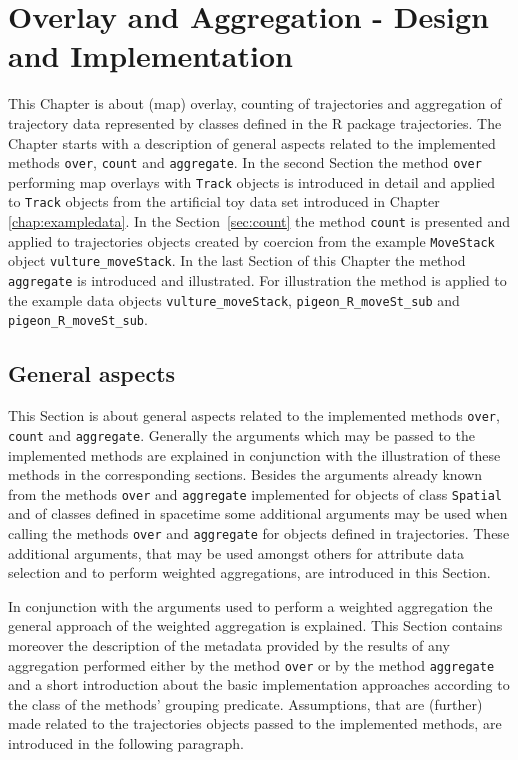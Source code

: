 \documentclass[12pt, oneside, a4paper]{scrbook}
\newcommand{\pkg}[1]{{\normalfont\fontseries{b}\selectfont #1}}
\let\proglang=\textsf
\let\code=\texttt
\begin{document}
\chapter{Overlay and Aggregation - Design and Implementation}
\label{chap:overandaggregate}

This Chapter is about (map) overlay, counting of trajectories and aggregation of trajectory data represented by classes defined in the \proglang{R} package \pkg{trajectories}.
The Chapter starts with a description of general aspects related to the implemented methods \code{over}, \code{count} and \code{aggregate}. 
In the second Section the method \code{over} performing map overlays with \code{Track} objects is introduced in detail and applied to \code{Track} objects from the artificial toy data set introduced in Chapter \ref{chap:exampledata}.
In the Section~\ref{sec:count} the method \code{count} is presented and applied to \pkg{trajectories} objects created by coercion from the example \code{MoveStack} object \code{vulture\_moveStack}.
In the last Section of this Chapter the method \code{aggregate} is introduced and illustrated.
For illustration the method is applied to the example data objects \code{vulture\_moveStack}, \code{pigeon\_R\_moveSt\_sub} and \code{pigeon\_R\_moveSt\_sub}.
\par\medskip


\section{General aspects}
\label{sec:generalaspects}

This Section is about general aspects related to the implemented methods \code{over}, \code{count} and \code{aggregate}.
Generally the arguments which may be passed to the implemented methods are explained in conjunction with the illustration of these methods in the corresponding sections.
Besides the arguments already known from the methods \code{over} and \code{aggregate} implemented for objects of class \code{Spatial} and of classes defined in \pkg{spacetime} some additional arguments may be used when calling the methods \code{over} and \code{aggregate} for objects defined in \pkg{trajectories}.
These additional arguments, that may be used amongst others for attribute data selection and to perform weighted aggregations, are introduced in this Section.
\par\medskip
In conjunction with the arguments used to perform a weighted aggregation the general approach of the weighted aggregation is explained.
This Section contains moreover the description of the metadata provided by the results of any aggregation performed either by the method \code{over} or by the method \code{aggregate} and
a short introduction about the basic implementation approaches according to the class of the methods' grouping predicate.
Assumptions, that are (further) made related to the \pkg{trajectories} objects passed to the implemented methods, are introduced in the following paragraph.
\par\medskip
\end{document}

